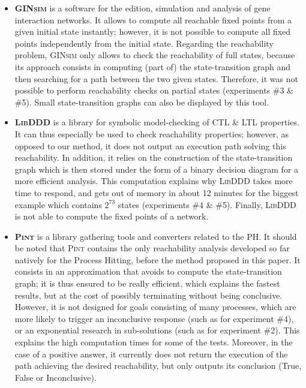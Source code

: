 \begin{itemize}[leftmargin=*]

\item \textbf{\textsc{GINsim}} is a software for the edition, simulation and analysis
of gene interaction networks.
It allows to compute all reachable fixed points from a given initial state instantly;
however, it is not possible to compute all fixed points independently from the initial state.
Regarding the reachability problem, \textsc{GINsim} only allows to check the reachability of
full states, because its approach consists in computing
(part of) the state-transition graph and then searching for a path between the two given states.
Therefore, it was not possible to perform reachability checks on partial states
(experiments \#3 \& \#5).
Small state-transition graphs can also be displayed by this tool.

\item \textbf{\textsc{LibDDD}}
is a library for symbolic model-checking of CTL \& LTL properties.
It can thus especially be used to check reachability properties;
however, as opposed to our method, it does not output an execution path
solving this reachability.
In addition, it relies on the construction of the state-transition graph
which is then stored under the form of a binary decision diagram for a more efficient analysis.
This computation explains why \textsc{LibDDD} takes more time to respond,
and gets out of memory in about 12 minutes for the biggest example
which contains $2^{73}$ states
(experiments \#4 \& \#5).
Finally, \textsc{LibDDD} is not able to compute the fixed points of a network.

\item \textbf{\textsc{Pint}}
is a library gathering tools and converters related to the PH.
It should be noted that \textsc{Pint} contains the only reachability analysis
developed so far natively for the Process Hitting,
before the method proposed in this paper.
It consists in an approximation that avoids to compute the state-transition graph;
it is thus ensured to be really efficient, which explains the fastest results,
but at the cost of possibly terminating without being conclusive.
However, it is not designed for goals consisting of many processes,
which are more likely to trigger an inconclusive response
(such as for experiment \#4),
or an exponential research in sub-solutions
(such as for experiment \#2).
This explains the high computation times for some of the tests.
Moreover, in the case of a positive answer,
it currently does not return the execution of the path achieving the desired reachability,
but only outputs its conclusion (True, False or Inconclusive).


\end{itemize}
